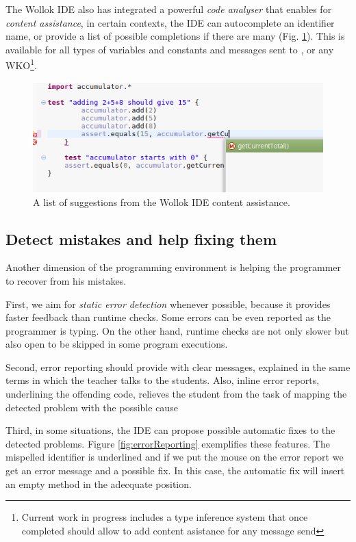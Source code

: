 The Wollok IDE also has integrated a powerful \emph{code analyser} that enables for \emph{content assistance}, 
\ie in certain contexts, the IDE can autocomplete an identifier name, or provide a list of possible completions if there are many (\cf Fig. \ref{fig:codeCompletion}).
This is available for all types of variables and constants and messages sent to ,  or any WKO\footnote{Current work in progress includes a type inference system that once completed should allow to add content asistance for any message send}. 
 
\begin{figure}[ht]
 \centering
 \includegraphics[scale=0.45]{images/codeCompletion.png}
 \caption{\small A list of suggestions from the Wollok IDE content assistance.}
 \label{fig:codeCompletion}
\end{figure}

\subsection{Detect mistakes and help fixing them}
Another dimension of the programming environment is helping the programmer to recover from his mistakes. 

First, we aim for \emph{static error detection} whenever possible, because it provides faster feedback than runtime checks.
Some errors can be even reported as the programmer is typing.
On the other hand, runtime checks are not only slower but also open to be skipped in some program executions.

Second, error reporting should provide with clear messages, explained in the same terms in which the teacher talks to the students. 
Also, inline error reports, \eg underlining the offending code, relieves the student from the task of mapping the detected problem with the possible cause 

Third, in some situations, the IDE can propose possible automatic fixes to the detected problems.
Figure \ref{fig:errorReporting} exemplifies these features. The mispelled identifier is underlined and if we put the mouse on the error report we get an error message and a possible fix.
In this case, the automatic fix will insert an empty method in the adecquate position.

